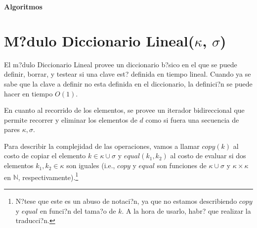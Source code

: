\documentclass[a4paper,10pt]{article}
\newenvironment{Algoritmos}{%
  \vspace*{2ex}%
  \noindent\textbf{\Large Algoritmos}%
  \vspace*{2ex}%
}{}
\begin{document}
\begin{Algoritmos}
  
\end{Algoritmos}

\section{M?dulo Diccionario Lineal($\kappa$, $\sigma$)}

El m?dulo Diccionario Lineal provee un diccionario b?sico en el que se puede definir, borrar, y testear si una clave est? definida en tiempo lineal.  Cuando ya se sabe que la clave a definir no esta definida en el diccionario, la definici?n se puede hacer en tiempo $O(1)$.

En cuanto al recorrido de los elementos, se provee un iterador bidireccional que permite recorrer y eliminar los elementos de $d$ como si fuera una secuencia de pares $\kappa,\sigma$.

Para describir la complejidad de las operaciones, vamos a llamar $copy(k)$ al costo de copiar el elemento $k \in \kappa \cup \sigma$ y $equal(k_1, k_2)$ al costo de evaluar si dos elementos $k_1, k_2 \in \kappa$ son iguales (i.e., $copy$ y $equal$ son funciones de $\kappa \cup \sigma$ y $\kappa \times \kappa$ en $\mathbb{N}$, respectivamente).\footnote{N?tese que este es un abuso de notaci?n, ya que no estamos describiendo $copy$ y $equal$ en funci?n del tama?o de $k$.  A la hora de usarlo, habr? que realizar la traducci?n.}
\end{document}
